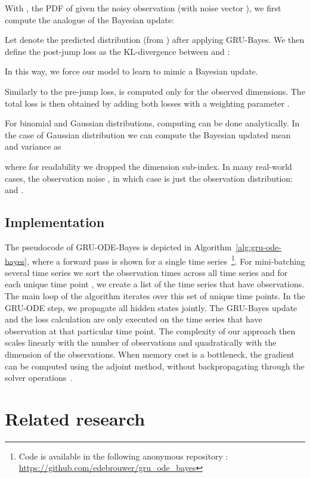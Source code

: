 \documentclass{article}
\newcommand{\method}{GRU-ODE-Bayes}
\begin{document}
With , the PDF of  given the noisy observation (with noise vector ), we first compute the analogue of the Bayesian update:








Let  denote the predicted distribution (from ) after applying GRU-Bayes. We then define the post-jump loss as the KL-divergence between   and :

In this way, we force our model to learn to mimic a Bayesian update.





Similarly to the pre-jump loss,  is computed only for the observed dimensions. The total loss is then obtained by adding  both losses with a weighting parameter .


For binomial and Gaussian distributions, computing  can be done analytically. In the case of Gaussian distribution we can compute the Bayesian updated mean  and variance  as

where for readability we dropped the dimension sub-index.
In many real-world cases, the observation noise , in which case  is just the observation distribution:  and .




\subsection{Implementation}
The pseudocode of \method{} is depicted in Algorithm~\ref{alg:gru-ode-bayes}, where a forward pass is shown for a single time series~\footnote{Code is available in the following anonymous repository : \url{https://github.com/edebrouwer/gru_ode_bayes} }.  For mini-batching several time series we sort the observation times across all time series and for each unique time point , we create a list of the time series that have observations. The main loop of the algorithm iterates over this set of unique time points. In the GRU-ODE step, we propagate all hidden states jointly. The GRU-Bayes update and the loss calculation are only executed on the time series that have observation at that particular time point. The complexity of our approach then scales linearly with the number of observations and quadratically with the dimension of the observations. When memory cost is a bottleneck, the gradient can be computed using the adjoint method, without backpropagating through the solver operations~\citep{neural_ode}.

\section{Related research}
\end{document}
